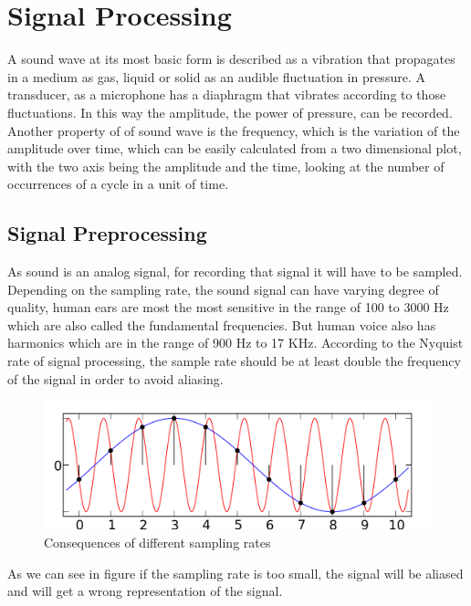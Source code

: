 \chapter{Signal Processing}\label{ch:signalProcessing}
A sound wave at its most basic form is described as a vibration that propagates in a medium as gas, 
liquid or solid as an audible fluctuation in pressure. A transducer, as a microphone has a diaphragm 
that vibrates according to those fluctuations. In this way the amplitude, the power of pressure, 
can be recorded. Another property of of sound wave is the frequency, which is the variation of 
the amplitude over time, which can be easily calculated from a two dimensional plot, with the 
two axis being the amplitude and the time, looking at the number of occurrences of a cycle in a unit of time.
\section{Signal Preprocessing}
As sound is an analog signal, for recording that signal it will have to be sampled. Depending on the 
sampling rate, the sound signal can have varying degree of quality, human ears are most the most 
sensitive in the range of 100 to 3000 Hz which are also called the fundamental frequencies. But 
human voice also has harmonics which are in the range of 900 Hz to 17 KHz.
According to the Nyquist rate of signal processing, the sample rate should be at 
least double the frequency of the signal in order to avoid aliasing. 
\newpage

\begin{figure}[htp]
	\centering
	\includegraphics[width=1\textwidth]{Illustrations/AliasingSines.png}
	\caption{Consequences of different sampling rates}
	\label{fig:AliasingSines}
\end{figure}

As we can see in figure  if the sampling rate is too small, the signal will 
be aliased and will get a wrong representation of the signal.

